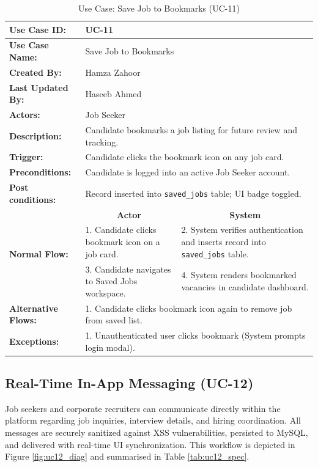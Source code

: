 \begin{table}[H]
\centering
\small
\caption{Use Case: Save Job to Bookmarks (UC-11)}
\label{tab:uc11_spec}
\begin{tabular}{|p{3.2cm}|p{5.5cm}|p{5.5cm}|}
\hline
\textbf{Use Case ID:} & \multicolumn{2}{p{11.4cm}|}{UC-11} \\ \hline
\textbf{Use Case Name:} & \multicolumn{2}{p{11.4cm}|}{Save Job to Bookmarks} \\ \hline
\textbf{Created By:} & \multicolumn{2}{p{11.4cm}|}{Hamza Zahoor} \\ \hline
\textbf{Last Updated By:} & \multicolumn{2}{p{11.4cm}|}{Haseeb Ahmed} \\ \hline
\textbf{Actors:} & \multicolumn{2}{p{11.4cm}|}{Job Seeker} \\ \hline
\textbf{Description:} & \multicolumn{2}{p{11.4cm}|}{Candidate bookmarks a job listing for future review and tracking.} \\ \hline
\textbf{Trigger:} & \multicolumn{2}{p{11.4cm}|}{Candidate clicks the bookmark icon on any job card.} \\ \hline
\textbf{Preconditions:} & \multicolumn{2}{p{11.4cm}|}{Candidate is logged into an active Job Seeker account.} \\ \hline
\textbf{Post conditions:} & \multicolumn{2}{p{11.4cm}|}{Record inserted into \texttt{saved\_jobs} table; UI badge toggled.} \\ \hline
\multirow{3}{*}{\textbf{Normal Flow:}} & \multicolumn{1}{c|}{\textbf{Actor}} & \multicolumn{1}{c|}{\textbf{System}} \\ \cline{2-3}
& 1. Candidate clicks bookmark icon on a job card. & 2. System verifies authentication and inserts record into \texttt{saved\_jobs} table. \vspace{2pt} \\
& 3. Candidate navigates to Saved Jobs workspace. & 4. System renders bookmarked vacancies in candidate dashboard. \\ \hline
\textbf{Alternative Flows:} & \multicolumn{2}{p{11.4cm}|}{1. Candidate clicks bookmark icon again to remove job from saved list.} \\ \hline
\textbf{Exceptions:} & \multicolumn{2}{p{11.4cm}|}{1. Unauthenticated user clicks bookmark (System prompts login modal).} \\ \hline
\end{tabular}
\end{table}

\subsection{Real-Time In-App Messaging (UC-12)}
Job seekers and corporate recruiters can communicate directly within the platform regarding job inquiries, interview details, and hiring coordination. All messages are securely sanitized against XSS vulnerabilities, persisted to MySQL, and delivered with real-time UI synchronization. This workflow is depicted in Figure \ref{fig:uc12_diag} and summarised in Table \ref{tab:uc12_spec}.

